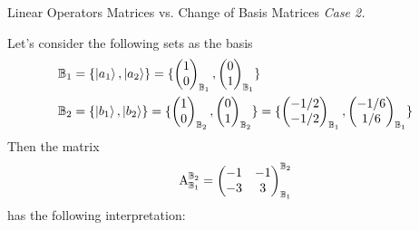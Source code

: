 \begin{example}{Linear Operators Matrices vs. Change of Basis Matrices}
	\emph{Case 2.}
	
	Let's consider the following sets as the basis
	\begin{align*}
		\mathbb{B}_1 &= \{ \ket{a_1}, \ket{a_2} \} = \{ 
		\begin{pmatrix}
			1 \\
			0
		\end{pmatrix}_{\mathbb{B}_1},
		\begin{pmatrix}
			0 \\
			1
		\end{pmatrix}_{\mathbb{B}_1}
		\} \\
		\mathbb{B}_2 &= \{ \ket{b_1}, \ket{b_2} \} = \{ 
		\begin{pmatrix}
			1 \\
			0
		\end{pmatrix}_{\mathbb{B}_2},
		\begin{pmatrix}
			0 \\
			1
		\end{pmatrix}_{\mathbb{B}_2}
		\} = 
		\{ 
		\begin{pmatrix}
			-1/2 \\
			-1/2
		\end{pmatrix}_{\mathbb{B}_1},
		\begin{pmatrix}
			-1/6 \\
			1/6
		\end{pmatrix}_{\mathbb{B}_1}
		\}
	\end{align*}
	Then the matrix
	\[ \operatorname{A}_{\mathbb{B}_1}^{\mathbb{B}_2} = \begin{pmatrix}
		-1	&	-1	\\
		-3	&	3	
	\end{pmatrix}_{\mathbb{B}_1}^{\mathbb{B}_2} \]
	has the following interpretation:
	

\end{example}
